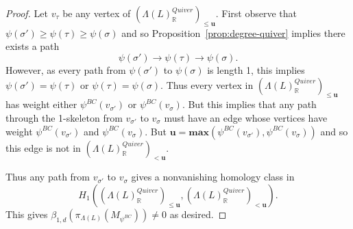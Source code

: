 \documentclass{amsart}
\newcommand{\RR}{\mathbb{R}}
\theoremstyle{remark}
\begin{document}
\begin{proof}
  Let $v_{\tau}$ be any vertex of $(\Lambda(L)_{\RR}^{Quiver})_{\leq \bm{u}}$. First observe that $\psi(\sigma')\geq \psi(\tau)\geq \psi(\sigma)$ and so Proposition~\ref{prop:degree-quiver} implies there exists a path
  \[\psi(\sigma')\rightarrow \psi(\tau)\rightarrow \psi(\sigma).\]
  However, as every path from $\psi(\sigma')$ to $\psi(\sigma)$ is length 1, this implies $\psi(\sigma')=\psi(\tau)$ or $\psi(\tau)=\psi(\sigma)$. Thus every vertex in $(\Lambda(L)_{\RR}^{Quiver})_{\leq \bm{u}}$ has weight either $\psi^{BC}(v_{\sigma'})$ or $\psi^{BC}(v_\sigma)$. But this implies that any path through the 1-skeleton from $v_{\sigma'}$ to $v_{\sigma}$ must have an edge whose vertices have weight $\psi^{BC}(v_{\sigma'})$ and $\psi^{BC}(v_\sigma)$. But $\bm{u} = \mathbf{max}(\psi^{BC}(v_{\sigma'}),\psi^{BC}(v_\sigma))$ and so this edge is not in $(\Lambda(L)_{\RR}^{Quiver})_{< \bm{u}}$.

  Thus any path from $v_{\sigma'}$ to $v_{\sigma}$ gives a nonvanishing homology class in
  \[H_1\left((\Lambda(L)_{\RR}^{Quiver})_{\leq \bm{u}},(\Lambda(L)_{\RR}^{Quiver})_{<\bm{u}}\right).\]
  This gives $\beta_{1,d}(\pi_{\Lambda(L)}(M_{\psi^{BC}}))\neq 0$ as desired.
\end{proof}
\end{document}
